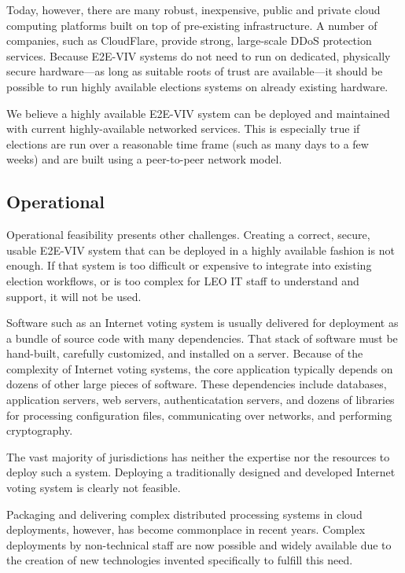 Today, however, there are many robust, inexpensive, public and private
cloud computing platforms built on top of pre-existing
infrastructure. A number of companies, such as CloudFlare, provide
strong, large-scale DDoS protection services. Because E2E-VIV systems
do not need to run on dedicated, physically secure hardware---as long
as suitable roots of trust are available---it should be possible to
run highly available elections systems on already existing hardware.

We believe a highly available E2E-VIV system can be deployed and
maintained with current highly-available networked services. This is
especially true if elections are run over a reasonable time frame
(such as many days to a few weeks) and are built using a peer-to-peer
network model.

\subsection{Operational}
\label{sec:operational}

Operational feasibility presents other challenges. Creating a correct,
secure, usable E2E-VIV system that can be deployed in a highly
available fashion is not enough. If that system is too difficult or
expensive to integrate into existing election workflows, or is too
complex for LEO IT staff to understand and support, it will not be
used.

Software such as an Internet voting system is usually delivered for
deployment as a bundle of source code with many dependencies. That
stack of software must be hand-built, carefully customized, and
installed on a server.  Because of the complexity of Internet voting
systems, the core application typically depends on dozens of other
large pieces of software.  These dependencies include databases,
application servers, web servers, authenticatation servers, and dozens
of libraries for processing configuration files, communicating over
networks, and performing cryptography.

The vast majority of jurisdictions has neither the expertise nor the
resources to deploy such a system. Deploying a traditionally designed
and developed Internet voting system is clearly not feasible.

Packaging and delivering complex distributed processing systems in
cloud deployments, however, has become commonplace in recent years.
Complex deployments by non-technical staff are now possible and widely
available due to the creation of new technologies invented
specifically to fulfill this need.

